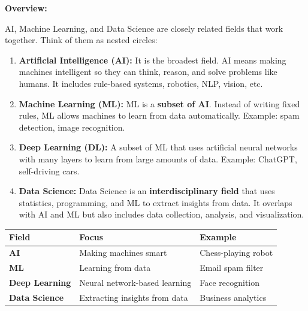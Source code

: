 \documentclass[12pt,a4paper]{article}
\newcommand{\term}[1]{\textbf{\color{headingcolor}#1}}
\begin{document}
\begin{answerenv}

\textbf{\color{headingcolor}Overview:}

AI, Machine Learning, and Data Science are closely related fields that work together. Think of them as nested circles:

\begin{center}
\end{center}

\begin{enumerate}[leftmargin=1.8em, itemsep=4pt]
  \item \term{Artificial Intelligence (AI):} It is the broadest field. AI means making machines intelligent so they can think, reason, and solve problems like humans. It includes rule-based systems, robotics, NLP, vision, etc.

  \item \term{Machine Learning (ML):} ML is a \textbf{subset of AI}. Instead of writing fixed rules, ML allows machines to learn from data automatically. Example: spam detection, image recognition.

  \item \term{Deep Learning (DL):} A subset of ML that uses artificial neural networks with many layers to learn from large amounts of data. Example: ChatGPT, self-driving cars.

  \item \term{Data Science:} Data Science is an \textbf{interdisciplinary field} that uses statistics, programming, and ML to extract insights from data. It overlaps with AI and ML but also includes data collection, analysis, and visualization.
\end{enumerate}

\begin{center}
\begin{tabular}{>{\bfseries}p{3cm} p{5.5cm} p{4cm}}
\toprule
\textbf{Field} & \textbf{Focus} & \textbf{Example} \\
\midrule
AI & Making machines smart & Chess-playing robot \\
ML & Learning from data & Email spam filter \\
Deep Learning & Neural network-based learning & Face recognition \\
Data Science & Extracting insights from data & Business analytics \\
\bottomrule
\end{tabular}
\end{center}


\end{answerenv}
\end{document}
